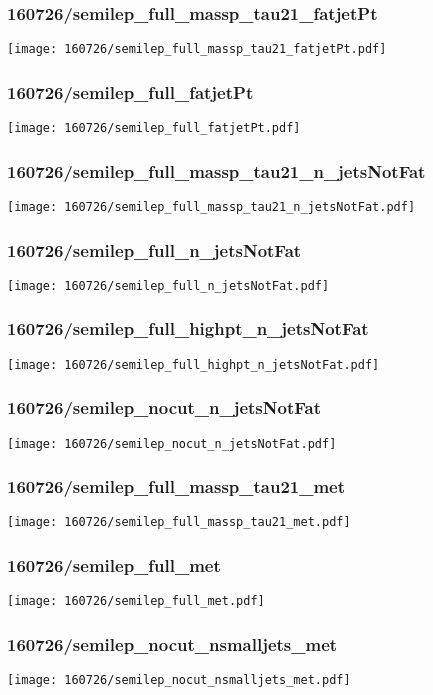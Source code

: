 \begin{frame}
   \frametitle{\small 160726/semilep\_full\_massp\_tau21\_fatjetPt}
   \centering
   \texttt{[image: 160726/semilep\_full\_massp\_tau21\_fatjetPt.pdf]}
\end{frame}

\begin{frame}
   \frametitle{\small 160726/semilep\_full\_fatjetPt}
   \centering
   \texttt{[image: 160726/semilep\_full\_fatjetPt.pdf]}
\end{frame}

\begin{frame}
   \frametitle{\small 160726/semilep\_full\_massp\_tau21\_n\_jetsNotFat}
   \centering
   \texttt{[image: 160726/semilep\_full\_massp\_tau21\_n\_jetsNotFat.pdf]}
\end{frame}

\begin{frame}
   \frametitle{\small 160726/semilep\_full\_n\_jetsNotFat}
   \centering
   \texttt{[image: 160726/semilep\_full\_n\_jetsNotFat.pdf]}
\end{frame}

\begin{frame}
   \frametitle{\small 160726/semilep\_full\_highpt\_n\_jetsNotFat}
   \centering
   \texttt{[image: 160726/semilep\_full\_highpt\_n\_jetsNotFat.pdf]}
\end{frame}

\begin{frame}
   \frametitle{\small 160726/semilep\_nocut\_n\_jetsNotFat}
   \centering
   \texttt{[image: 160726/semilep\_nocut\_n\_jetsNotFat.pdf]}
\end{frame}

\begin{frame}
   \frametitle{\small 160726/semilep\_full\_massp\_tau21\_met}
   \centering
   \texttt{[image: 160726/semilep\_full\_massp\_tau21\_met.pdf]}
\end{frame}

\begin{frame}
   \frametitle{\small 160726/semilep\_full\_met}
   \centering
   \texttt{[image: 160726/semilep\_full\_met.pdf]}
\end{frame}

\begin{frame}
   \frametitle{\small 160726/semilep\_nocut\_nsmalljets\_met}
   \centering
   \texttt{[image: 160726/semilep\_nocut\_nsmalljets\_met.pdf]}
\end{frame}

